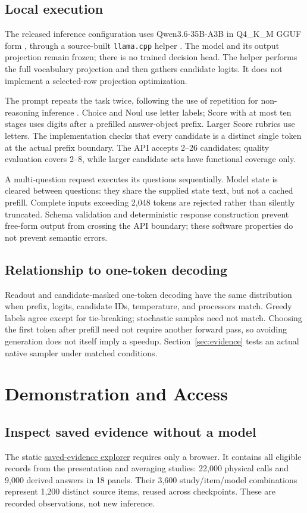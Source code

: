 \documentclass[11pt]{article}
\newcommand{\ExplorerURL}{\href{https://uphash-network.github.io/mini-jev/explorer/}{saved-evidence explorer}}
\begin{document}
\subsection{Local execution}
The released inference configuration uses Qwen3.6-35B-A3B in Q4\_K\_M GGUF form \citep{qwen36,qwen36gguf}, through a source-built \texttt{llama.cpp} helper \citep{llamacpp}. The model and its output projection remain frozen; there is no trained decision head. The helper performs the full vocabulary projection and then gathers candidate logits. It does not implement a selected-row projection optimization.

The prompt repeats the task twice, following the use of repetition for non-reasoning inference \citep{leviathan2025repetition}. Choice and Noul use letter labels; Score with at most ten stages uses digits after a prefilled answer-object prefix. Larger Score rubrics use letters. The implementation checks that every candidate is a distinct single token at the actual prefix boundary. The API accepts 2--26 candidates; quality evaluation covers 2--8, while larger candidate sets have functional coverage only.

A multi-question request executes its questions sequentially. Model state is cleared between questions: they share the supplied state text, but not a cached prefill. Complete inputs exceeding 2,048 tokens are rejected rather than silently truncated. Schema validation and deterministic response construction prevent free-form output from crossing the API boundary; these software properties do not prevent semantic errors.

\subsection{Relationship to one-token decoding}
Readout and candidate-masked one-token decoding have the same distribution when prefix, logits, candidate IDs, temperature, and processors match. Greedy labels agree except for tie-breaking; stochastic samples need not match. Choosing the first token after prefill need not require another forward pass, so avoiding generation does not itself imply a speedup. Section~\ref{sec:evidence} tests an actual native sampler under matched conditions.

\section{Demonstration and Access}
\label{sec:demo}
\subsection{Inspect saved evidence without a model}
The static \ExplorerURL{} requires only a browser. It contains all eligible records from the presentation and averaging studies: 22,000 physical calls and 9,000 derived answers in 18 panels. Their 3,600 study/item/model combinations represent 1,200 distinct source items, reused across checkpoints. These are recorded observations, not new inference.
\end{document}

